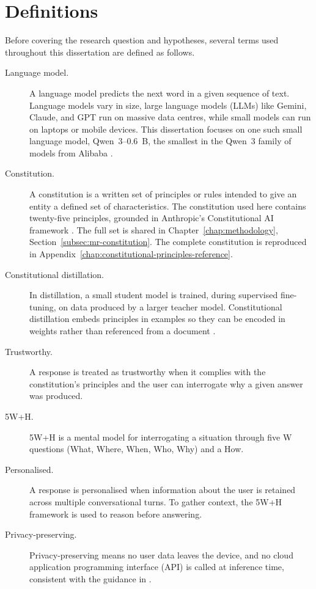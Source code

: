\section{Definitions}
\label{sec:definitions}

Before covering the research question and hypotheses, several terms used throughout this dissertation are defined as follows.

\begin{description}
  \item[Language model.] A language model predicts the next word in a given sequence of text. Language models vary in size, large language models (LLMs) like Gemini, Claude, and GPT run on massive data centres, while small models can run on laptops or mobile devices. This dissertation focuses on one such small language model, Qwen~3--0.6~B, the smallest in the Qwen~3 family of models from Alibaba \cite{yang2025qwen3technicalreport}.
  \item[Constitution.] A constitution is a written set of principles or rules intended to give an entity a defined set of characteristics. The constitution used here contains twenty-five principles, grounded in Anthropic's Constitutional AI framework \cite{bai2022constitutionalaiharmlessnessai}. The full set is shared in Chapter~\ref{chap:methodology}, Section~\ref{subsec:mr-constitution}. The complete constitution is reproduced in Appendix~\ref{chap:constitutional-principles-reference}.
  \item[Constitutional distillation.] In distillation, a small student model is trained, during supervised fine-tuning, on data produced by a larger teacher model. Constitutional distillation embeds principles in examples so they can be encoded in weights rather than referenced from a document \cite{bai2022constitutionalaiharmlessnessai}. 
  \item[Trustworthy.] A response is treated as trustworthy when it complies with the constitution's principles and the user can interrogate why a given answer was produced.
  \item[5W+H.] 5W+H is a mental model for interrogating a situation through five W questions (What, Where, When, Who, Why) and a How. 
  \item[Personalised.] A response is personalised when information about the user is retained across multiple conversational turns. To gather context, the 5W+H framework is used to reason before answering.
  \item[Privacy-preserving.] Privacy-preserving means no user data leaves the device, and no cloud application programming interface (API) is called at inference time, consistent with the guidance in \cite{euhleg2019}.

\end{description}
